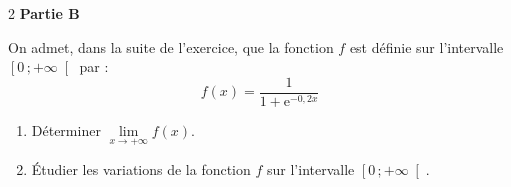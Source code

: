 \documentclass[a4paper,10pt]{article}
\makeatletter
\newcommand{\lycee@intfo}[2]{\left[#1\,;#2\right[}
\providecommand{\intfo}{\lycee@intfo}%
\newcommand{\e}{\mathrm{e}}
\makeatother
\begin{document}
\begin{multicols}{2}
\textbf{Partie B}

On admet, dans la suite de l'exercice, que la fonction $f$ est définie sur
l'intervalle $\intfo{0}{+\infty}$ par :
\[f(x)=\dfrac{1}{1+\e^{-0{,}2x}}\]
\begin{enumerate}
  \item Déterminer $\lim\limits_{x\to+\infty}f(x)$.
  \item Étudier les variations de la fonction $f$ sur l'intervalle $\intfo{0}{+\infty}$.
\end{enumerate}

\end{multicols}
\end{document}
